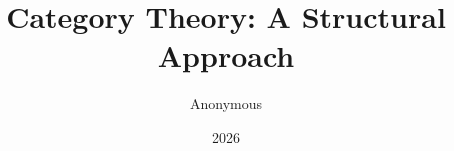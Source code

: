 \documentclass{amsbook}
\begin{document}
\frontmatter

\title{Category Theory: A Structural Approach}
\author{Anonymous}
\date{2026}
\maketitle

\tableofcontents

\mainmatter












\appendix




\backmatter

\printbibliography[heading=bibintoc, title={Bibliography}]
\end{document}
